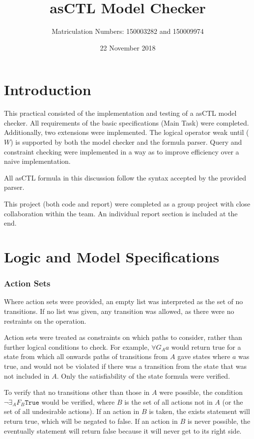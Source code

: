 \documentclass[a4paper,11pt]{article}
\title{asCTL Model Checker}
\author{Matriculation Numbers: 150003282 and 150009974}
\date{22 November 2018}
\begin{document}
	
	\maketitle
	
	\pagebreak
	\section{Introduction}
	This practical consisted of the implementation and testing of a asCTL model checker. All requirements of the basic specifications (Main Task) were completed. Additionally, two extensions were implemented. The logical operator weak until ($W$) is supported by both the model checker and the formula parser. Query and constraint checking were implemented in a way as to improve efficiency over a naive implementation.
	
	All asCTL formula in this discussion follow the syntax accepted by the provided parser.
	
	This project (both code and report) were completed as a group project with close collaboration within the team. An individual report section is included at the end. 
	
	\section{Logic and Model Specifications}
	\subsubsection{Action Sets}
	Where action sets were provided, an empty list was interpreted as the set of no transitions. If no list was given, any transition was allowed, as there were no restraints on the operation.
	
	Action sets were treated as constraints on which paths to consider, rather than further logical conditions to check. For example, $\forall G{_Aa}$ would return true for a state from which all onwards paths of transitions from $A$ gave states where $a$ was true, and would not be violated if there was a transition from the state that was not included in $A$. Only the satisfiability of the state formula were verified.
	
	To verify that no transitions other than those in $A$ were possible, the condition $\neg \exists _A F{_B}\texttt{True}$ would be verified, where $B$ is the set of all actions not in $A$ (or the set of all undesirable actions). If an action in $B$ is taken, the exists statement will return true, which will be negated to false. If an action in $B$ is never possible, the eventually statement will return false because it will never get to its right side.
	
\end{document}
